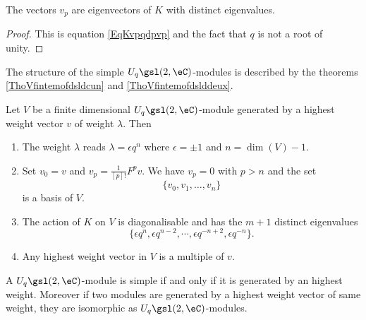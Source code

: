 \begin{corollary}
    The vectors \( v_p\) are eigenvectors of \( K\) with distinct eigenvalues.
\end{corollary}

\begin{proof}
    This is equation \eqref{EqKvpqdpvp} and the fact that \( q\) is not a root of unity.
\end{proof}

The structure of the simple \( U_q\gsl(2,\eC)\)-modules is described by the theorems \ref{ThoVfintemofdsldcun} and \ref{ThoVfintemofdslddeux}.

\begin{theorem}     \label{ThoVfintemofdsldcun}
    Let \( V\) be a finite dimensional \( U_q\gsl(2,\eC)\)-module generated by a highest weight vector \( v\) of weight \( \lambda\). Then
    \begin{enumerate}
        \item       \label{ItemThoVintmoddcuni}
            The weight \( \lambda\) reads \( \lambda=\epsilon q^n\) where \( \epsilon=\pm 1\) and \( n=\dim(V)-1\).
        \item       \label{ItemThoVintmoddcunii}
            Set \( v_0=v\) and \( v_p=\frac{1}{ [p]! }F^pv\). We have \( v_p=0\) with \( p>n\) and the set
            \begin{equation}
                \{ v_0,v_1,\ldots,v_n \}
            \end{equation}
            is a basis of \( V\).
        \item       \label{ItemThoVintmoddcuniii}
            The action of \( K\) on \( V\) is diagonalisable and has the \( m+1\) distinct eigenvalues
            \begin{equation}
                \{ \epsilon q^n,\epsilon q^{n-2},\cdots,\epsilon q^{-n+2},\epsilon q^{-n} \}.
            \end{equation}
        \item       \label{ItemThoVintmoddcuniv}
            Any highest weight vector in \( V\) is a multiple of \( v\).
    \end{enumerate}
\end{theorem}

\begin{theorem}     \label{ThoVfintemofdslddeux}
    A \( U_q\gsl(2,\eC)\)-module is simple if and only if it is generated by an highest weight. Moreover if two modules are generated by a highest weight vector of same weight, they are isomorphic as \( U_q\gsl(2,\eC)\)-modules.
\end{theorem}

